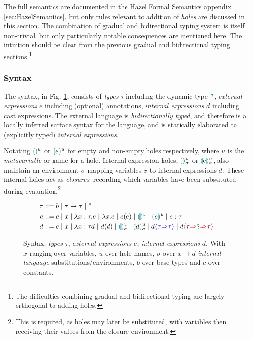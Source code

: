 The full semantics are documented in the Hazel Formal Semantics appendix \ref{sec:HazelSemantics}, but only rules relevant to addition of \textit{holes} are  discussed in this section. The combination of gradual and bidirectional typing system is itself non-trivial, but only particularly notable consequences are mentioned here. The intuition should be clear from the previous gradual and bidirectional typing sections.\footnote{The difficulties combining gradual and bidirectional typing are largely orthogonal to adding holes.}

\subsubsection{Syntax}\label{sec:HazelSyntax}
\par The syntax, in Fig. \ref{fig:syntax}, consists of \textit{types} $\tau$ including the dynamic type $\dyn$, \textit{external expressions} $e$ including (optional) annotations, \textit{internal expressions} $d$ including cast expressions. The external language is \textit{bidirectionally typed}, and therefore is a locally inferred surface syntax for the language, and is statically elaborated to (explicitly typed) \textit{internal expressions}.

Notating $\hole{}^u$ or $\hole[e]^u$ for empty and non-empty holes respectively, where $u$ is the \textit{metavariable} or name for a hole. Internal expression holes, $\hole{}^u_\sigma$ or $\hole[e]^u_\sigma$, also maintain an environment $\sigma$ mapping variables $x$ to internal expressions $d$. These internal holes act as \textit{closures}, recording which variables have been substituted during evaluation.\footnote{This is required, as holes may later be substituted, with variables then receiving their values from the closure environment.}
\begin{figure}[h]
\begin{align*}
\tau &::= b \mid \tau \to \tau \mid\  ?\\
e &::= c \mid x \mid \lambda x : \tau.e \mid \lambda x. e \mid e(e) \mid \hole^u \mid \hole[e]^u \mid e : \tau\\
d &::= c \mid x \mid \lambda x : \tau d \mid d(d) \mid \hole^u_\sigma \mid \hole[d]^u_\sigma \mid d\scast{\tau}{\tau} \mid d\scasterror{\tau}{\tau}
\end{align*}
\caption{Syntax: \textit{types} $\tau$, \textit{external expressions} $e$, \textit{internal expressions} $d$. With $x$ ranging over variables, $u$ over hole names, $\sigma$ over $x \to d$ \textit{internal language} substitutions/environments, $b$ over base types and $c$ over constants.}
\label{fig:syntax}
\end{figure}

